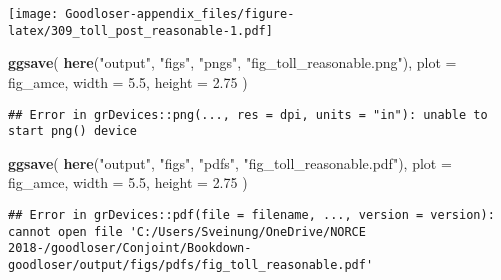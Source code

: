 \documentclass[]{book}
\newenvironment{Shaded}{\begin{snugshade}}{\end{snugshade}}
\newcommand{\KeywordTok}[1]{\textcolor[rgb]{0.13,0.29,0.53}{\textbf{#1}}}
\newcommand{\DataTypeTok}[1]{\textcolor[rgb]{0.13,0.29,0.53}{#1}}
\newcommand{\FloatTok}[1]{\textcolor[rgb]{0.00,0.00,0.81}{#1}}
\newcommand{\StringTok}[1]{\textcolor[rgb]{0.31,0.60,0.02}{#1}}
\newcommand{\NormalTok}[1]{#1}
\begin{document}
\texttt{[image: Goodloser-appendix\_files/figure-latex/309\_toll\_post\_reasonable-1.pdf]}

\begin{Shaded}
\begin{Highlighting}[]
\KeywordTok{ggsave}\NormalTok{(}
  \KeywordTok{here}\NormalTok{(}\StringTok{"output"}\NormalTok{, }\StringTok{"figs"}\NormalTok{, }\StringTok{"pngs"}\NormalTok{, }\StringTok{"fig_toll_reasonable.png"}\NormalTok{),}
  \DataTypeTok{plot =}\NormalTok{ fig_amce,}
  \DataTypeTok{width =} \FloatTok{5.5}\NormalTok{, }\DataTypeTok{height =} \FloatTok{2.75}
\NormalTok{)}
\end{Highlighting}
\end{Shaded}

\begin{verbatim}
## Error in grDevices::png(..., res = dpi, units = "in"): unable to start png() device
\end{verbatim}

\begin{Shaded}
\begin{Highlighting}[]
\KeywordTok{ggsave}\NormalTok{(}
  \KeywordTok{here}\NormalTok{(}\StringTok{"output"}\NormalTok{, }\StringTok{"figs"}\NormalTok{, }\StringTok{"pdfs"}\NormalTok{, }\StringTok{"fig_toll_reasonable.pdf"}\NormalTok{),}
  \DataTypeTok{plot =}\NormalTok{ fig_amce,}
  \DataTypeTok{width =} \FloatTok{5.5}\NormalTok{, }\DataTypeTok{height =} \FloatTok{2.75}
\NormalTok{)}
\end{Highlighting}
\end{Shaded}

\begin{verbatim}
## Error in grDevices::pdf(file = filename, ..., version = version): cannot open file 'C:/Users/Sveinung/OneDrive/NORCE 2018-/goodloser/Conjoint/Bookdown-goodloser/output/figs/pdfs/fig_toll_reasonable.pdf'
\end{verbatim}
\end{document}
